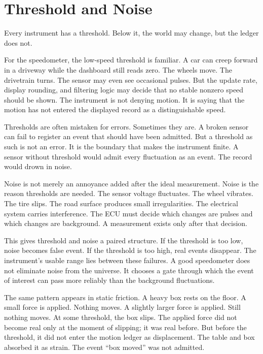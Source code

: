 \section{Threshold and Noise}
\label{se:threshold-and-noise}

Every instrument has a threshold. Below it, the world may change, but the ledger
does not.

For the speedometer, the low-speed threshold is familiar. A car can creep
forward in a driveway while the dashboard still reads zero. The wheels move.
The drivetrain turns. The sensor may even see occasional pulses. But the update
rate, display rounding, and filtering logic may decide that no stable nonzero
speed should be shown. The instrument is not denying motion. It is saying that
the motion has not entered the displayed record as a distinguishable speed.

Thresholds are often mistaken for errors. Sometimes they are. A broken sensor
can fail to register an event that should have been admitted. But a threshold as
such is not an error. It is the boundary that makes the instrument finite. A
sensor without threshold would admit every fluctuation as an event. The record
would drown in noise.

Noise is not merely an annoyance added after the ideal measurement. Noise is the
reason thresholds are needed. The sensor voltage fluctuates. The wheel vibrates.
The tire slips. The road surface produces small irregularities. The electrical
system carries interference. The ECU must decide which changes are pulses and
which changes are background. A measurement exists only after that decision.

This gives threshold and noise a paired structure. If the threshold is too low,
noise becomes false event. If the threshold is too high, real events disappear.
The instrument's usable range lies between these failures. A good speedometer
does not eliminate noise from the universe. It chooses a gate through which the
event of interest can pass more reliably than the background fluctuations.

The same pattern appears in static friction. A heavy box rests on the floor. A
small force is applied. Nothing moves. A slightly larger force is applied. Still
nothing moves. At some threshold, the box slips. The applied force did not
become real only at the moment of slipping; it was real before. But before the
threshold, it did not enter the motion ledger as displacement. The table and box
absorbed it as strain. The event ``box moved'' was not admitted.

